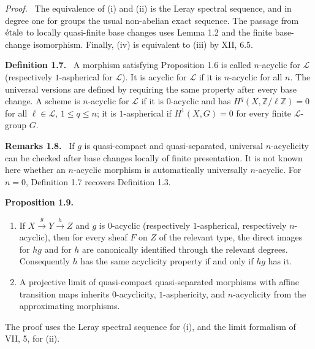 \documentclass[12pt]{article}
\newcommand{\Zz}{\mathbb{Z}}
\newcommand{\LL}{\mathcal L}
\newcommand{\etale}{\ifmmode\textnormal{\'etale}\else\'etale\fi}
\newenvironment{statement}[1]{\par\medskip\noindent\textbf{#1.}\ }{\par\medskip}
\newenvironment{remarktext}[1]{\par\medskip\noindent\textbf{#1.}\ }{\par\medskip}
\newenvironment{prooftext}[1][Proof]{\par\noindent\emph{#1.}\ }{\par\medskip}
\begin{document}
\begin{prooftext}
The equivalence of (i) and (ii) is the Leray spectral sequence, and in degree one for groups the usual non-abelian exact sequence. The passage from \(\etale\) to locally quasi-finite base changes uses Lemma 1.2 and the finite base-change isomorphism. Finally, (iv) is equivalent to (iii) by XII, 6.5.
\end{prooftext}

\begin{statement}{Definition 1.7}
A morphism satisfying Proposition 1.6 is called \(n\)-acyclic for \(\LL\) (respectively \(1\)-aspherical for \(\LL\)). It is acyclic for \(\LL\) if it is \(n\)-acyclic for all \(n\). The universal versions are defined by requiring the same property after every base change. A scheme is \(n\)-acyclic for \(\LL\) if it is \(0\)-acyclic and has \(H^q(X,\Zz/\ell\Zz)=0\) for all \(\ell\in\LL\), \(1\le q\le n\); it is \(1\)-aspherical if \(H^1(X,G)=0\) for every finite \(\LL\)-group \(G\).
\end{statement}

\begin{remarktext}{Remarks 1.8}
If \(g\) is quasi-compact and quasi-separated, universal \(n\)-acyclicity can be checked after base changes locally of finite presentation. It is not known here whether an \(n\)-acyclic morphism is automatically universally \(n\)-acyclic. For \(n=0\), Definition 1.7 recovers Definition 1.3.
\end{remarktext}

\begin{statement}{Proposition 1.9}
\begin{enumerate}[label=(\roman*)]
\item If \(X\xrightarrow gY\xrightarrow hZ\) and \(g\) is \(0\)-acyclic (respectively \(1\)-aspherical, respectively \(n\)-acyclic), then for every sheaf \(F\) on \(Z\) of the relevant type, the direct images for \(hg\) and for \(h\) are canonically identified through the relevant degrees. Consequently \(h\) has the same acyclicity property if and only if \(hg\) has it.
\item A projective limit of quasi-compact quasi-separated morphisms with affine transition maps inherits \(0\)-acyclicity, \(1\)-asphericity, and \(n\)-acyclicity from the approximating morphisms.
\end{enumerate}
\end{statement}

The proof uses the Leray spectral sequence for (i), and the limit formalism of VII, 5, for (ii).
\end{document}
